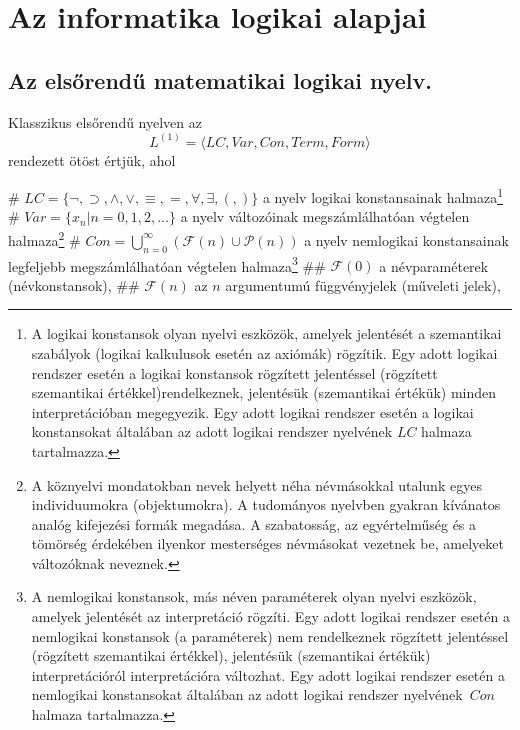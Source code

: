 \section{Az informatika logikai alapjai}
\def\InterpretOnNu{^{\langle U, \rho \rangle}_{\nu}}
\subsection{Az elsőrendű matematikai logikai nyelv.}
\begin{definition}
	Klasszikus elsőrendű nyelven az $$ L^{(1)} = \langle LC,Var,Con,Term,Form\rangle $$ rendezett ötöst értjük, ahol\\
	\begin{easylist}
	# $LC = \{\neg,\supset,\land,\lor,\equiv,=,\forall,\exists,(,)\}$ a nyelv logikai konstansainak halmaza\footnote{A logikai konstansok olyan nyelvi eszközök, amelyek jelentését a szemantikai szabályok (logikai kalkulusok esetén az axiómák) rögzítik. Egy adott logikai rendszer esetén a logikai konstansok rögzített jelentéssel (rögzített szemantikai értékkel)rendelkeznek, jelentésük (szemantikai értékük) minden interpretációban megegyezik. Egy adott logikai rendszer esetén a logikai konstansokat általában az adott logikai rendszer nyelvének $LC$	halmaza tartalmazza.}
	# $Var = \{x_{n}| n = 0,1,2,\dots\}$ a nyelv változóinak megszámlálhatóan végtelen halmaza\footnote{A köznyelvi mondatokban nevek helyett néha névmásokkal utalunk egyes individuumokra (objektumokra). A tudományos nyelvben gyakran kívánatos analóg kifejezési formák megadása. A szabatosság, az egyértelműség és a tömörség érdekében ilyenkor mesterséges névmásokat vezetnek be, amelyeket változóknak neveznek.}
	# $Con = \bigcup_{n=0}^\infty(\mathcal{F}(n)\cup\mathcal{P}(n))$ a nyelv nemlogikai konstansainak legfeljebb megszámlálhatóan végtelen halmaza\footnote{A nemlogikai konstansok, más néven paraméterek olyan nyelvi eszközök, amelyek jelentését az interpretáció rögzíti. Egy adott logikai rendszer esetén a nemlogikai konstansok (a paraméterek) nem rendelkeznek rögzített jelentéssel (rögzített szemantikai értékkel), jelentésük (szemantikai értékük) interpretációról interpretációra változhat. Egy adott logikai rendszer esetén a nemlogikai konstansokat általában az adott logikai rendszer nyelvének $Con$ halmaza tartalmazza.}
	## $\mathcal{F}(0)$ a névparaméterek (névkonstansok),
	## $\mathcal{F}(n)$ az $ n $ argumentumú függvényjelek (műveleti jelek),

\end{easylist}
\end{definition}
